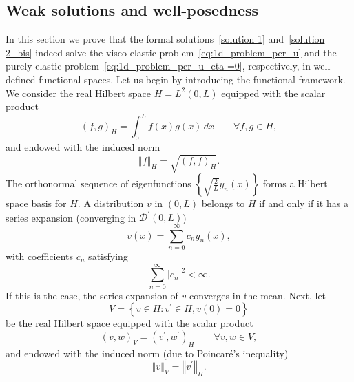 \documentclass[12pt,a4paper]{amsart}
\theoremstyle{definition}
\begin{document}
\subsection{Weak solutions and well-posedness}
In this section we prove that the
formal solutions~\eqref{solution 1} and~\eqref{solution 2_bis} indeed solve the visco-elastic problem~\eqref{eq:1d_problem_per_u}  and the purely elastic problem~\eqref{eq:1d_problem_per_u_eta =0}, respectively, in well-defined functional spaces. Let us begin by introducing the
functional framework. We consider the real Hilbert
space $H=L^{2}\left( 0,L\right) $ equipped with the scalar product
\begin{equation*}
(f,g)_{H}=\int_{0}^{L}f(x)g(x)\,dx\qquad \forall f,g\in H,
\end{equation*}%
and endowed with the induced norm
\begin{equation*}
\left\Vert f\right\Vert _{H}=\sqrt{(f,f)_{H}}.
\end{equation*}%
The orthonormal sequence of eigenfunctions $\left\{ \sqrt{\frac{2}{L}}%
y_{n}\left( x\right) \right\} $ forms a Hilbert space basis for $H$. A
distribution $v$ in $\left( 0,L\right) $ belongs to $H$ if and only if it
has a series expansion (converging in $\mathcal{D}^{\prime }\left(
0,L\right) $)
\begin{equation}
v\left( x\right) =\sum_{n=0}^{\infty }c_{n}y_{n}\left( x\right),
\label{series}
\end{equation}%
with coefficients $c_{n}$ satisfying%
\begin{equation*}
\sum_{n=0}^{\infty }\left\vert c_{n}\right\vert ^{2}<\infty.
\end{equation*}%
If this is the case, the series expansion of $v$ converges in the mean.
Next, let
\begin{equation*}
V=\left\{ v\in H:v^{\prime }\in H,v\left( 0\right) =0\right\}
\end{equation*}%
be the real Hilbert space equipped with the scalar product
\begin{equation*}
\left( v,w\right) _{V}=\left( v^{\prime },w^{\prime }\right) _{H}\qquad \forall
v,w\in V,
\end{equation*}%
and endowed with the induced norm (due to Poincar{\'{e}}'s inequality)
\begin{equation*}
\left\Vert v\right\Vert _{V}=\left\Vert v^{\prime }\right\Vert _{H}.
\end{equation*}%
\end{document}
